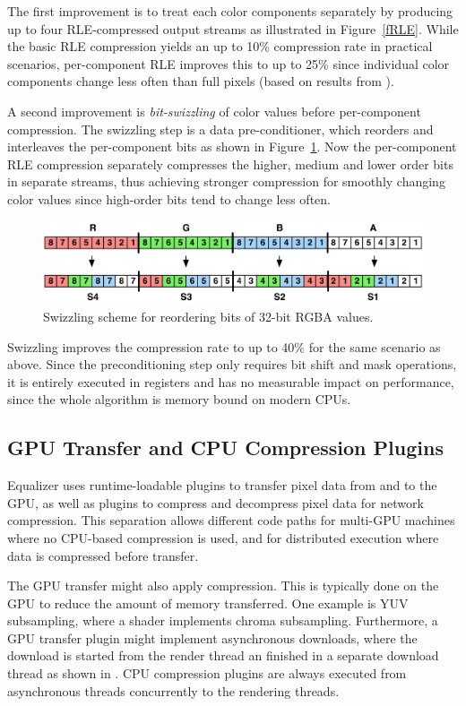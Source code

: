 The first improvement is to treat each color components separately by producing
up to four RLE-compressed output streams as illustrated in Figure~\ref{fRLE}.
While the basic RLE compression yields an up to 10\% compression rate in
practical scenarios, per-component RLE improves this to up to 25\% since
individual color components change less often than full pixels (based on results
from \cite{MEP:10}).


A second improvement is {\em bit-swizzling} of color values before per-component
compression. The swizzling step is a data pre-conditioner, which reorders and
interleaves the per-component bits as shown in Figure~\ref{fSwizzle}. Now the
per-component RLE compression separately compresses the higher, medium and lower
order bits in separate streams, thus achieving stronger compression for smoothly
changing color values since high-order bits tend to change less often.

\begin{figure}[h!t]
  \centering
  \includegraphics[width=\textwidth]{images/swizzle}
  \caption{Swizzling scheme for reordering bits of 32-bit RGBA values.}
  \label{fSwizzle}
\end{figure}

Swizzling improves the compression rate to up to 40\% for the same scenario as
above. Since the preconditioning step only requires bit shift and mask
operations, it is entirely executed in registers and has no measurable
impact on performance, since the whole algorithm is memory bound on modern CPUs.


\subsection{GPU Transfer and CPU Compression Plugins}

Equalizer uses runtime-loadable plugins to transfer pixel data from and to the
GPU, as well as plugins to compress and decompress pixel data for network
compression. This separation allows different code paths for multi-GPU machines
where no CPU-based compression is used, and for distributed execution where data
is compressed before transfer.

The GPU transfer might also apply compression. This is typically done on the GPU
to reduce the amount of memory transferred. One example is YUV subsampling,
where a shader implements chroma subsampling. Furthermore, a GPU transfer plugin
might implement asynchronous downloads, where the download is started from the
render thread an finished in a separate download thread as shown in
. CPU compression plugins are always executed from asynchronous
threads concurrently to the rendering threads.

